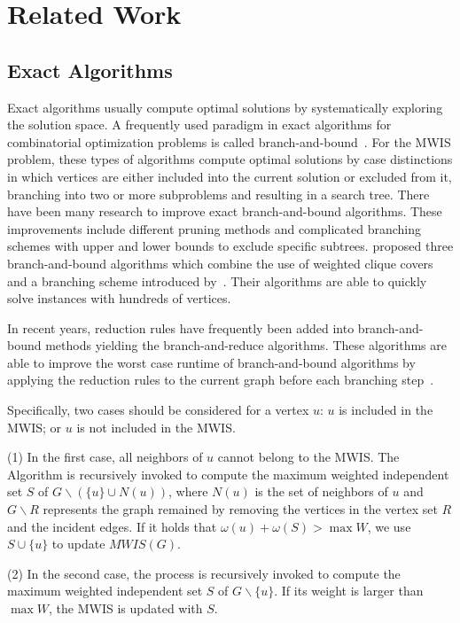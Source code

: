 \documentclass[sigconf, nonacm]{acmart}
\begin{document}
\section{Related Work}

\subsection{Exact Algorithms}

Exact algorithms usually compute optimal solutions by systematically exploring the solution space. A frequently used paradigm in exact algorithms for combinatorial optimization problems is called branch-and-bound~\cite{ostergaard2002fast,warren2006combinatorial}. For the MWIS problem, these types of algorithms compute optimal solutions by case distinctions in which vertices are either included into the current solution or excluded from it, branching into two or more subproblems and resulting in a search tree. There have been many research to improve exact branch-and-bound algorithms. These improvements include different pruning methods and complicated branching schemes with upper and lower bounds to exclude specific subtrees. \citet{warren2006combinatorial} proposed three branch-and-bound algorithms which combine the use of weighted clique covers and a branching scheme introduced by~\citet{balas1986finding}. Their algorithms are able to quickly solve instances with hundreds of vertices.

In recent years, reduction rules have frequently been added into branch-and-bound methods yielding the branch-and-reduce algorithms. These algorithms are able to improve the worst case runtime of branch-and-bound algorithms by applying the reduction rules to the current graph before each branching step~\cite{fomin2009measure}. 

Specifically, two cases should be considered for a vertex $u$: $u$ is included in the MWIS; or $u$ is not included in the MWIS. 

\noindent(1) In the first case, all neighbors of $u$ cannot belong to the MWIS. The Algorithm is recursively invoked to compute the maximum weighted independent set $S$ of $G\backslash(\{u\} \cup N(u))$, where $N(u)$ is the set of neighbors of $u$ and $G\backslash R$ represents the graph remained by removing the vertices in the vertex set $R$ and the incident edges. If it holds that $\omega(u)+\omega(S)>\max W$, we use $S\cup\{u\}$ to update $MWIS(G)$. 

\noindent(2) In the second case, the process is recursively invoked to compute the maximum weighted independent set $S$ of $G\backslash\{u\}$. If its weight is larger than $\max W$, the MWIS is updated with $S$.
\end{document}
